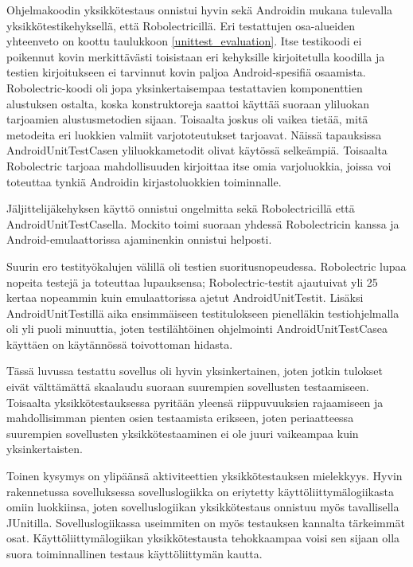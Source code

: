 Ohjelmakoodin yksikkötestaus onnistui hyvin sekä Androidin mukana tulevalla yksikkötestikehyksellä, että Robolectricillä. Eri testattujen osa-alueiden yhteenveto on koottu taulukkoon \ref{unittest_evaluation}. Itse testikoodi ei poikennut kovin merkittävästi toisistaan eri kehyksille kirjoitetulla koodilla ja testien kirjoitukseen ei tarvinnut kovin paljoa Android-spesifiä osaamista. Robolectric-koodi oli jopa yksinkertaisempaa testattavien komponenttien alustuksen ostalta, koska konstruktoreja saattoi käyttää suoraan yliluokan tarjoamien alustusmetodien sijaan. Toisaalta joskus oli vaikea tietää, mitä metodeita eri luokkien valmiit varjototeutukset tarjoavat. Näissä tapauksissa AndroidUnitTestCasen yliluokkametodit olivat käytössä selkeämpiä. Toisaalta Robolectric tarjoaa mahdollisuuden kirjoittaa itse omia varjoluokkia, joissa voi toteuttaa tynkiä Androidin kirjastoluokkien toiminnalle.

Jäljittelijäkehyksen käyttö onnistui ongelmitta sekä Robolectricillä että AndroidUnitTestCasella. Mockito toimi suoraan yhdessä Robolectricin kanssa ja Android-emulaattorissa ajaminenkin onnistui helposti.

Suurin ero testityökalujen välillä oli testien suoritusnopeudessa. Robolectric lupaa nopeita testejä ja toteuttaa lupauksensa; Robolectric-testit ajautuivat yli 25 kertaa nopeammin kuin emulaattorissa ajetut AndroidUnitTestit. Lisäksi AndroidUnitTestillä aika ensimmäiseen testitulokseen pienelläkin testiohjelmalla oli yli puoli minuuttia, joten testilähtöinen ohjelmointi AndroidUnitTestCasea käyttäen on käytännössä toivottoman hidasta.

Tässä luvussa testattu sovellus oli hyvin yksinkertainen, joten jotkin tulokset eivät välttämättä skaalaudu suoraan suurempien sovellusten testaamiseen. Toisaalta yksikkötestauksessa pyritään yleensä riippuvuuksien rajaamiseen ja mahdollisimman pienten osien testaamista erikseen, joten periaatteessa suurempien sovellusten yksikkötestaaminen ei ole juuri vaikeampaa kuin yksinkertaisten. 

Toinen kysymys on ylipäänsä aktiviteettien yksikkötestauksen mielekkyys. Hyvin rakennetussa sovelluksessa sovelluslogiikka on eriytetty käyttöliittymälogiikasta omiin luokkiinsa, joten sovelluslogiikan yksikkötestaus onnistuu myös tavallisella JUnitilla. Sovelluslogiikassa useimmiten on myös testauksen kannalta tärkeimmät osat. Käyttöliittymälogiikan yksikkötestausta tehokkaampaa voisi sen sijaan olla suora toiminnallinen testaus käyttöliittymän kautta.
